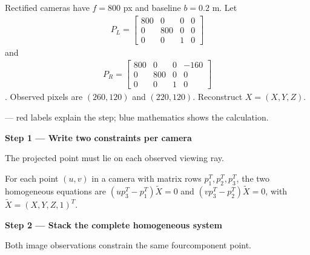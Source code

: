 \documentclass[letterpaper,11pt,english,openany,oneside]{jupyterBook}
\begin{document}
\sphinxAtStartPar
Rectified cameras have \(f=800\) px and baseline \(b=0.2\) m. Let
\begin{equation*}
\begin{split}
P_L=\begin{bmatrix}800&0&0&0\\0&800&0&0\\0&0&1&0\end{bmatrix}
\end{split}
\end{equation*}
\sphinxAtStartPar
and
\begin{equation*}
\begin{split}
P_R=\begin{bmatrix}800&0&0&-160\\0&800&0&0\\0&0&1&0\end{bmatrix}
\end{split}
\end{equation*}
\sphinxAtStartPar
. Observed pixels are \((260,120)\) and \((220,120)\). Reconstruct \(X=(X,Y,Z)\).

\par\medskip

\sphinxAtStartPar
{} — red labels explain the step; blue mathematics shows the calculation.

\par\medskip{}
{\color{QuizStepRed}\bfseries Step 1 — Write two constraints per camera}\par\smallskip

\sphinxAtStartPar
{} The projected point must lie on each observed viewing ray.

\sphinxAtStartPar
For each point {\color{QuizMathBlue} \((u,v)\)} in a camera with matrix rows {\color{QuizMathBlue} \(p_1^T,p_2^T,p_3^T\)}, the two homogeneous equations are {\color{QuizMathBlue} \((up_3^T-p_1^T)\widetilde X=0\)} and {\color{QuizMathBlue} \((vp_3^T-p_2^T)\widetilde X=0\)}, with {\color{QuizMathBlue} \(\widetilde X=(X,Y,Z,1)^T\)}.

\par

\par\medskip{}
{\color{QuizStepRed}\bfseries Step 2 — Stack the complete homogeneous system}\par\smallskip

\sphinxAtStartPar
{} Both image observations constrain the same four\sphinxhyphen{}component point.
\end{document}
